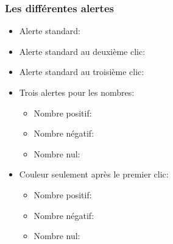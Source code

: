 \documentclass[
    9pt, aspectratio = 169,
    xcolor = {dvipsnames},
    hyperref = {pdftex, pdfpagemode=UseNone, hidelinks, pdfdisplaydoctitle=true},
    usepdftitle = false
]{beamer}
\begin{document}
\begin{frame}
    \frametitle{Les différentes alertes}
    \begin{itemize}
        \item Alerte standard: 
        \item Alerte standard au deuxième clic: 
        \item Alerte standard au troisième clic: 
        \item Trois alertes pour les nombres:
              \begin{itemize}
                  \item Nombre positif: 
                  \item Nombre négatif: 
                  \item Nombre nul: 
              \end{itemize}
        \item Couleur seulement après le premier clic:
              \begin{itemize}
                  \item Nombre positif: 
                  \item Nombre négatif: 
                  \item Nombre nul: 
              \end{itemize}
    \end{itemize}
\end{frame}

\lastslide
\end{document}
